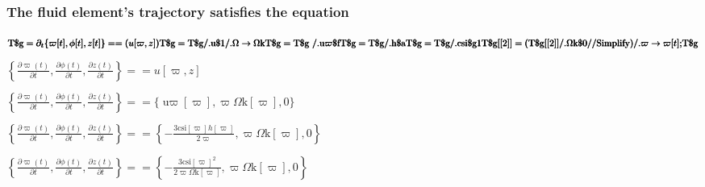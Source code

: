 \documentclass{article}
\begin{document}
\subsubsection*{The fluid element{'}s trajectory satisfies the equation}

\begin{doublespace}
\noindent\(\pmb{\text{T$\$$g} = \partial _t\{\varpi [t], \phi [t],z[t]\} == (u[\varpi ,z])}\\
\pmb{\text{T$\$$g} = \text{T$\$$g} \text{/.} \text{u$\$$1} \text{/.} \Omega \to  \text{$\Omega $k}}\\
\pmb{\text{T$\$$g} = \text{T$\$$g}\text{   }\text{/.} \text{u$\varpi \$$f}}\\
\pmb{\text{T$\$$g} = \text{T$\$$g} \text{/.} \text{h$\$$a} }\\
\pmb{\text{T$\$$g} = \text{T$\$$g} \text{/.} \text{csi$\$$g1}}\\
\pmb{\text{T$\$$g}[[2]] = (\text{T$\$$g}[[2]] \text{/.} \text{$\Omega $k$\$$0} \text{//}\text{Simplify})\text{/.} \varpi \to  \varpi [t];}\\
\pmb{\text{T$\$$g}}\)
\end{doublespace}

\begin{doublespace}
\noindent\(\left\{\frac{\partial \varpi (t)}{\partial t},\frac{\partial \phi (t)}{\partial t},\frac{\partial z(t)}{\partial t}\right\}==u[\varpi
,z]\)
\end{doublespace}

\begin{doublespace}
\noindent\(\left\{\frac{\partial \varpi (t)}{\partial t},\frac{\partial \phi (t)}{\partial t},\frac{\partial z(t)}{\partial t}\right\}==\{\text{u$\varpi
$}[\varpi ],\varpi  \text{$\Omega $k}[\varpi ],0\}\)
\end{doublespace}

\begin{doublespace}
\noindent\(\left\{\frac{\partial \varpi (t)}{\partial t},\frac{\partial \phi (t)}{\partial t},\frac{\partial z(t)}{\partial t}\right\}==\left\{-\frac{3
\text{csi}[\varpi ] h[\varpi ]}{2 \varpi },\varpi  \text{$\Omega $k}[\varpi ],0\right\}\)
\end{doublespace}

\begin{doublespace}
\noindent\(\left\{\frac{\partial \varpi (t)}{\partial t},\frac{\partial \phi (t)}{\partial t},\frac{\partial z(t)}{\partial t}\right\}==\left\{-\frac{3
\text{csi}[\varpi ]^2}{2 \varpi  \text{$\Omega $k}[\varpi ]},\varpi  \text{$\Omega $k}[\varpi ],0\right\}\)
\end{doublespace}
\end{document}
